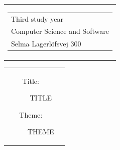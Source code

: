 

\thispagestyle{empty}
\begin{titlingpage}
 \begin{nopagebreak}
 {\samepage 
 \begin{tabular}{r}
\parbox{\textwidth}{  
 \hfill \parbox{4.9cm}{\begin{tabular}{l}
{\textsf\small \textsf{Third study year}}\\
{\textsf\small \textsf{Computer Science and Software}} \\
{\textsf\small \textsf{Selma Lagerlöfsvej 300}} \\
 \end{tabular}}
}
\end{tabular}

 \begin{tabular}{cc}
\parbox{7cm}{
\begin{description}

\item[Title:]

TITLE
  
 \item[Theme:]

THEME

 \end{description}

\parbox{8cm}{

}}
\end{tabular}}
\end{nopagebreak}
\end{titlingpage}
